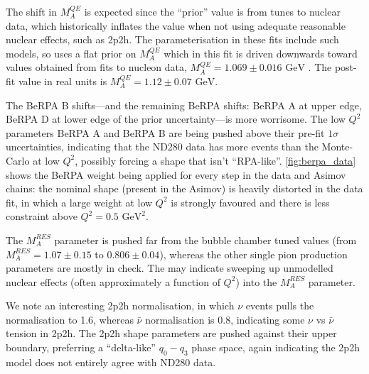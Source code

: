 The shift in $M_A^{QE}$ is expected since the ``prior'' value is from tunes to nuclear data, which historically inflates the value when not using adequate reasonable nuclear effects, such as 2p2h\cite{ccqe_tuning}. The parameterisation in these fits include such models, so uses a flat prior on $M_A^{QE}$ which in this fit is driven downwards toward values obtained from fits to nucleon data, $M_A^{QE}=1.069\pm0.016\text{ GeV}$ \cite{maqe_fit}. The post-fit value in real units is $M_A^{QE}=1.12\pm0.07\text{ GeV}$.

The BeRPA B shifts---and the remaining BeRPA shifts: BeRPA A at upper edge, BeRPA D at lower edge of the prior uncertainty---is more worrisome. The low $Q^2$ parameters BeRPA A and BeRPA B are being pushed above their pre-fit $1\sigma$ uncertainties, indicating that the ND280 data has more events than the Monte-Carlo at low $Q^2$, possibly forcing a shape that isn't ``RPA-like''. \autoref{fig:berpa_data} shows the BeRPA weight being applied for every step in the data and Asimov chains: the nominal shape (present in the Asimov) is heavily distorted in the data fit, in which a large weight at low $Q^2$ is strongly favoured and there is less constraint above $Q^2=0.5\text{ GeV}^2$.

The $M_A^{RES}$ parameter is pushed far from the bubble chamber tuned values (from $M_A^{RES}=1.07\pm0.15$ to $0.806\pm0.04$), whereas the other single pion production parameters are mostly in check. The may indicate sweeping up unmodelled nuclear effects (often approximately a function of $Q^2$) into the $M_A^{RES}$ parameter.

We note an interesting 2p2h normalisation, in which $\nu$ events pulls the normalisation to 1.6, whereas $\bar{\nu}$ normalisation is 0.8, indicating some $\nu$ vs $\bar{\nu}$ tension in 2p2h. The 2p2h shape parameters are pushed against their upper boundary, preferring a ``delta-like'' $q_0-q_3$ phase space, again indicating the 2p2h model does not entirely agree with ND280 data.

